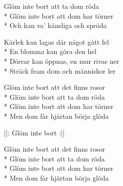 \begin{SongText}
\begin{SongVerse}
Glöm inte bort att ta dom röda\\*%
Glöm inte bort att dom har törner\\*%
Och kan va’ känsliga och spröda
\end{SongVerse}
\begin{SongVerse}
Kärlek kan lagas där något gått fel\\*%
En blomma kan göra den hel\\*%
Dörrar kan öppnas, en mur rivas ner\\*%
Sträck fram dom och människor ler
\end{SongVerse}
\begin{SongVerse}
Glöm inte bort att det finns rosor\\*%
Glöm inte bort att ta dom röda\\*%
Glöm inte bort att dom har törner\\*%
Men dom får hjärtan börja glöda
\end{SongVerse}
\begin{SongVerse}
||: Glöm inte bort :||
\end{SongVerse}
\begin{SongVerse}
Glöm inte bort att det finns rosor\\*%
Glöm inte bort att ta dom röda\\*%
Glöm inte bort att dom har törner\\*%
Men dom får hjärtan börja glöda
\end{SongVerse}
\end{SongText}
